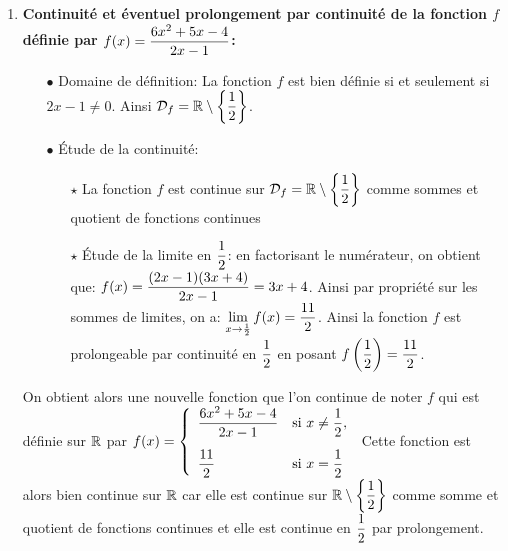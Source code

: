 \documentclass[a4paper, 11pt,reqno]{article}
\begin{document}
\begin{correction}
\begin{enumerate}
\begin{itemize}
\begin{itemize}
			            \end{itemize}
		      \end{itemize}
		      On obtient alors une nouvelle fonction que l'on continue de noter $f$ qui est d\'efinie sur $\R$ par $f(x)=\left\lbrace \begin{array}{ll}  x^2\cos{\left( \ddp\frac{1}{x} \right)}& \hbox{si}\ x\not= 0,\vsec\\ 0& \hbox{si}\ x=0  \end{array}\right.$ Cette fonction est alors bien continue sur $\R$ car elle est continue sur $\R^{\star}$ comme quotient, compos\'ee et produit de fonctions continues et elle est continue en 0 par prolongement.
		\item \textbf{Continuit\'e et \'eventuel prolongement par continuit\'e de la fonction $f$ d\'efinie par $f(x)= \displaystyle\frac{6x^2+5x-4}{2x-1}$:}
		      \begin{itemize}
			      \item[$\bullet$] Domaine de d\'efinition: La fonction $f$ est bien d\'efinie si et seulement si $2x-1\not= 0$. Ainsi $\mathcal{D}_{f}=\mathbb{R}\setminus\left\lbrace\displaystyle\frac{1}{2}\right\rbrace$.
			      \item[$\bullet$] \'Etude de la continuit\'e:
			            \begin{itemize}
				            \item[$\star$] La fonction $f$ est continue sur $\mathcal{D}_{f}=\mathbb{R}\setminus\left\lbrace\displaystyle\frac{1}{2}\right\rbrace$ comme sommes et quotient de fonctions continues
				            \item[$\star$] \'Etude de la limite en $\displaystyle\frac{1}{2}$: en factorisant le num\'erateur, on obtient que: $f(x)=\displaystyle\frac{(2x-1)(3x+4)}{2x-1}=3x+4$. Ainsi par propri\'et\'e sur les sommes de limites, on a: $\lim\limits_{x\to \frac{1}{2}} f(x)=\displaystyle\frac{11}{2}$. Ainsi la fonction $f$ est prolongeable par continuit\'e en $\displaystyle\frac{1}{2}$ en posant $f\left(\displaystyle\frac{1}{2}\right)=\displaystyle\frac{11}{2}$.
			            \end{itemize}
		      \end{itemize}
		      On obtient alors une nouvelle fonction que l'on continue de noter $f$ qui est d\'efinie sur $\R$ par $f(x)=\left\lbrace \begin{array}{ll}  \ddp\frac{6x^2+5x-4}{2x-1} & \hbox{si}\ x\not= \ddp\demi,\vsec\\ \ddp\frac{11}{2}& \hbox{si}\ x=\ddp\demi  \end{array}\right.$ Cette fonction est alors bien continue sur $\R$ car elle est continue sur $\mathbb{R}\setminus\left\lbrace \displaystyle\frac{1}{2}\right\rbrace$ comme somme et quotient de fonctions continues et elle est continue en $\displaystyle\frac{1}{2}$ par prolongement.

\end{enumerate}
\end{correction}
\end{document}
